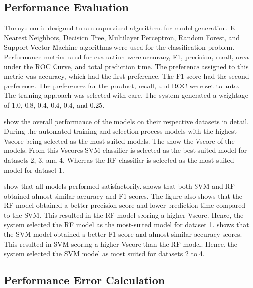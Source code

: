 \documentclass[a4paper,fleqn]{cas-dc}
\begin{document}
\subsection{Performance Evaluation} \label{subsec:performance_evaluation}

The system is designed to use supervised algorithms for model generation. K-Nearest Neighbors, Decision Tree, Multilayer Perceptron, Random Forest, and Support Vector Machine algorithms were used for the classification problem. Performance metrics used for evaluation were accuracy, F1, precision, recall, area under the ROC Curve, and total prediction time. The preference assigned to this metric was accuracy, which had the first preference. The F1 score had the second preference. The preferences for the product, recall, and ROC were set to auto. The training approach was selected with care. The system generated a weightage of 1.0, 0.8, 0.4, 0.4, 0.4, and 0.25.

 show the overall performance of the models on their respective datasets in detail. During the automated training and selection process models with the highest Vscore being selected as the most-suited models. The  show the Vscore of the models. From this Vscores SVM classifier is selected as the best-suited model for datasets 2, 3, and 4. Whereas the RF classifier is selected as the most-suited model for dataset 1.

 show that all models performed satisfactorily.  shows that both SVM and RF obtained almost similar accuracy and F1 scores. The figure also shows that the RF model obtained a better precision score and lower prediction time compared to the SVM. This resulted in the RF model scoring a higher Vscore. Hence, the system selected the RF model as the most-suited model for dataset 1.  shows that the SVM model obtained a better F1 score and almost similar accuracy scores. This resulted in SVM scoring a higher Vscore than the RF model. Hence, the system selected the SVM model as most suited for datasets 2 to 4.

\subsection{Performance Error Calculation}
\end{document}
